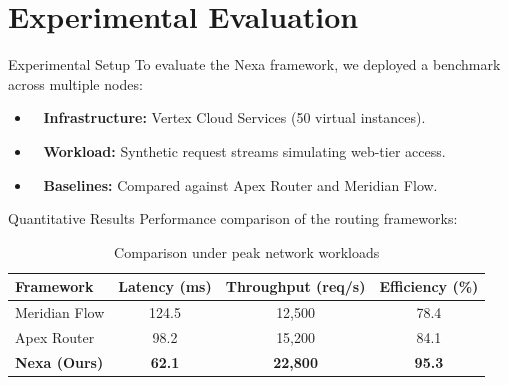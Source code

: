 \section{Experimental Evaluation}

\begin{frame}{Experimental Setup}
    To evaluate the Nexa framework, we deployed a benchmark across multiple nodes:
    \begin{itemize}
        \item \faServer ~ \textbf{Infrastructure:} Vertex Cloud Services (50 virtual instances).
        \item \faCogs ~ \textbf{Workload:} Synthetic request streams simulating web-tier access.
        \item \faChartLine ~ \textbf{Baselines:} Compared against Apex Router and Meridian Flow.
    \end{itemize}
\end{frame}

\begin{frame}{Quantitative Results}
    Performance comparison of the routing frameworks:
    \begin{table}
        \centering
        \begin{tabular}{lccc}
            \toprule
            Framework & Latency (ms) & Throughput (req/s) & Efficiency (\%) \\
            \midrule
            Meridian Flow & 124.5 & 12,500 & 78.4 \\
            Apex Router & 98.2 & 15,200 & 84.1 \\
            \textbf{Nexa (Ours)} & \textbf{62.1} & \textbf{22,800} & \textbf{95.3} \\
            \bottomrule
        \end{tabular}
        \caption{Comparison under peak network workloads}
    \end{table}
\end{frame}

